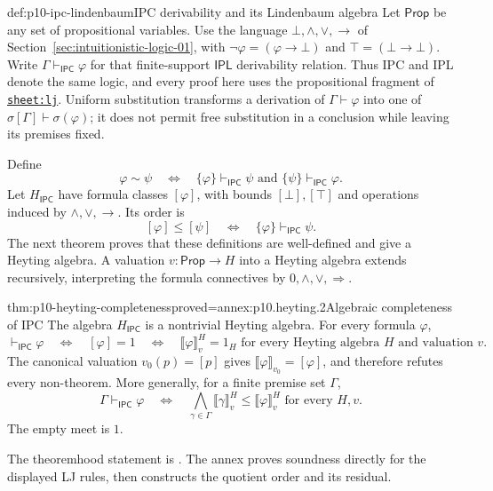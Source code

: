 \begin{hbdefinition}{def:p10-ipc-lindenbaum}{IPC derivability and its Lindenbaum algebra}
Let \(\mathsf{Prop}\) be any set of propositional variables.
Use the language \(\bot,\land,\lor,\to\) of
Section~\ref{sec:intuitionistic-logic-01}, with
\(\neg\varphi=(\varphi\to\bot)\) and
\(\top=(\bot\to\bot)\).
Write \(\Gamma\vdash_{\mathsf{IPC}}\varphi\) for that
finite-support \(\mathsf{IPL}\) derivability relation.
Thus IPC and IPL denote the same logic, and every proof here
uses the propositional fragment of
\hyperref[sheet:lj]{\texttt{sheet:lj}}.
Uniform substitution transforms a derivation of
\(\Gamma\vdash\varphi\) into one of
\(\sigma[\Gamma]\vdash\sigma(\varphi)\); it does not permit
free substitution in a conclusion while leaving its premises fixed.

Define
\[
 \varphi\sim\psi
 \quad\Longleftrightarrow\quad
 \{\varphi\}\vdash_{\mathsf{IPC}}\psi
       \text{ and }\{\psi\}\vdash_{\mathsf{IPC}}\varphi.
\]
Let \(H_{\mathsf{IPC}}\) have formula classes \([\varphi]\),
with bounds \([\bot],[\top]\) and operations induced by
\(\land,\lor,\to\).
Its order is
\[
 [\varphi]\leq[\psi]
          \quad\Longleftrightarrow\quad
          \{\varphi\}\vdash_{\mathsf{IPC}}\psi.
\]
The next theorem proves that these definitions are well-defined
and give a Heyting algebra.
A valuation \(v:\mathsf{Prop}\to H\) into a Heyting algebra extends
recursively, interpreting the formula connectives by
\(0,\wedge,\vee,\Rightarrow\).
\end{hbdefinition}

\begin{hbtheorem}{thm:p10-heyting-completeness}{proved=annex:p10.heyting.2}{Algebraic completeness of IPC}
The algebra \(H_{\mathsf{IPC}}\) is a nontrivial Heyting algebra.
For every formula \(\varphi\),
\[
 \vdash_{\mathsf{IPC}}\varphi
 \quad\Longleftrightarrow\quad
 [\varphi]=1
 \quad\Longleftrightarrow\quad
 \llbracket\varphi\rrbracket_v^H=1_H
       \text{ for every Heyting algebra }H\text{ and valuation }v.
\]
The canonical valuation \(v_0(p)=[p]\) gives
\(\llbracket\varphi\rrbracket_{v_0}=[\varphi]\), and therefore
refutes every non-theorem.
More generally, for a finite premise set \(\Gamma\),
\[
 \Gamma\vdash_{\mathsf{IPC}}\varphi
 \quad\Longleftrightarrow\quad
 \bigwedge_{\gamma\in\Gamma}\llbracket\gamma\rrbracket_v^H
       \leq\llbracket\varphi\rrbracket_v^H
       \text{ for every }H,v.
\]
The empty meet is \(1\).
\end{hbtheorem}

The theoremhood statement is
\cite[Theorem~2.2.16, p.~25]{Bezhanishvili2006Thesis}.
The annex proves soundness directly for the displayed LJ rules,
then constructs the quotient order and its residual.


